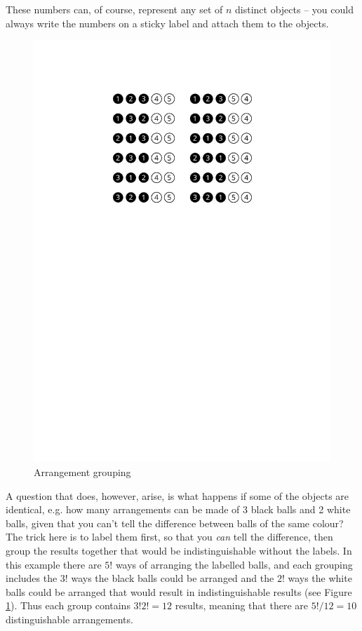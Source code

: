 \documentclass[a5paper]{article}
\begin{document}
These numbers can, of course, represent any set of $n$ distinct objects -- you
could always write the numbers on a sticky label and attach them to the objects.

\begin{figure}[ht]
  \includegraphics{arrangement-grouping}
  \caption{Arrangement grouping}
  \label{fig:2}
\end{figure}

A question that does, however, arise, is what happens if some of the objects are
identical, e.g. how many arrangements can be made of 3 black balls and 2 white
balls, given that you can't tell the difference between balls of the same
colour? The trick here is to label them first, so that you \textit{can} tell the
difference, then group the results together that would be indistinguishable
without the labels. In this example there are $5!$ ways of arranging the
labelled balls, and each grouping includes the $3!$ ways the black balls could
be arranged and the $2!$ ways the white balls could be arranged that would
result in indistinguishable results (see Figure \ref{fig:2}). Thus each group
contains $3!2! = 12$ results, meaning that there are $5!/12 = 10$
distinguishable arrangements.
\end{document}
